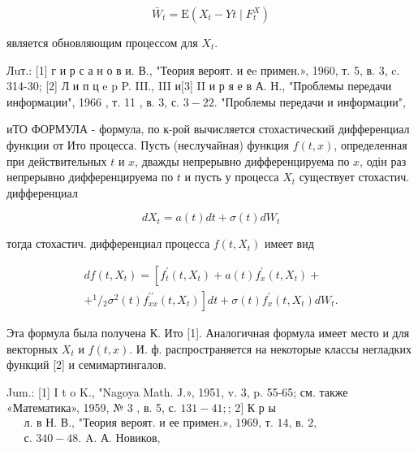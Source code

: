 \documentclass[10pt]{article}
\begin{document}
\[

\bar{W}_{t}=\mathrm{E}\left(X_{t}-Y t \mid F_{t}^{X}\right)

\]



является обновляющим процессом для $X_{t}$.



Лuт.: [1] г и р с а н о в и. В., "Теория вероят. и еe примен.», 1960, т. 5, в. 3, c. 314-30; [2] Л и п ц e p P. III., III и[3] II и р я е в А. Н., "Проблемы передачи информации", 1966 , т. 11 , в. 3, с. $3-22$. "Проблемы передачи и информации",



иТО ФОРМУЛА - формула, по к-рой вычисляется стохастический дифференциал функции от Ито процесса. Пусть (неслучайная) функция $f(t, x)$, определенная при действительных $t$ и $x$, дважды непрерывно дифференцируема по $x$, одін раз непрерывно дифференцируема по $t$ и пусть у процесса $X_{t}$ существует стохастич. дифференциал



\[

d X_{t}=a(t) d t+\sigma(t) d W_{t}

\]



тогда стохастич. дифференциал процесса $f\left(t, X_{t}\right)$ имеет вид



\[

\begin{gathered}

d f\left(t, X_{t}\right)=\left[f_{t}^{\prime}\left(t, X_{t}\right)+a(t) f_{x}^{\prime}\left(t, X_{t}\right)+\right. \\

\left.+{ }^{1} /{ }_{2} \sigma^{2}(t) f_{x x}^{\prime \prime}\left(t, X_{t}\right)\right] d t+\sigma(t) f_{x}^{\prime}\left(t, X_{t}\right) d W_{t} .

\end{gathered}

\]



Эта формула была получена К. Ито [1]. Аналогичная формула имеет место и для векторных $X_{t}$ и $f(t, x)$. И. ф. распространяется на некоторые классы негладких функций [2] и семимартингалов.



Jum.: [1] I t o K., "Nagoya Math. J.», 1951, v. 3, p. 55-65; см. также «Математика», 1959, № 3 , в. 5, с. $131-41 ;$; 2$]$ К р ы$\begin{aligned} & \text { л. в Н. В., "Теория вероят. и ее примен.», 1969, т. 14, в. 2, } \\ & \text { с. } 340-48 . \text { A. А. Новиков, }\end{aligned}$
\end{document}
